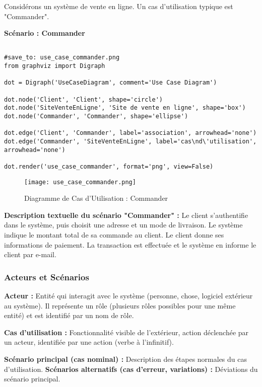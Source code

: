 \documentclass{article}
\begin{document}
\begin{itemize}
Considérons un système de vente en ligne.  Un cas d'utilisation typique est "Commander".

\textbf{Scénario : Commander}

\begin{verbatim}

#save_to: use_case_commander.png
from graphviz import Digraph

dot = Digraph('UseCaseDiagram', comment='Use Case Diagram')

dot.node('Client', 'Client', shape='circle')
dot.node('SiteVenteEnLigne', 'Site de vente en ligne', shape='box')
dot.node('Commander', 'Commander', shape='ellipse')

dot.edge('Client', 'Commander', label='association', arrowhead='none')
dot.edge('Commander', 'SiteVenteEnLigne', label='cas\nd\'utilisation', arrowhead='none')

dot.render('use_case_commander', format='png', view=False)

\end{verbatim}

\begin{figure}[H]
    \centering
    \texttt{[image: use\_case\_commander.png]}
    \caption{Diagramme de Cas d'Utilisation : Commander}
    \label{fig:use_case_commander}
\end{figure}

\noindent \textbf{Description textuelle du scénario "Commander" :}
Le client s'authentifie dans le système, puis choisit une adresse et un mode de livraison. Le système indique le montant total de sa commande au client. Le client donne ses informations de paiement. La transaction est effectuée et le système en informe le client par e-mail.

\subsubsection{Acteurs et Scénarios}

\textbf{Acteur :} Entité qui interagit avec le système (personne, chose, logiciel extérieur au système).  Il représente un rôle (plusieurs rôles possibles pour une même entité) et est identifié par un nom de rôle.

\textbf{Cas d'utilisation :} Fonctionnalité visible de l'extérieur, action déclenchée par un acteur, identifiée par une action (verbe à l'infinitif).

\textbf{Scénario principal (cas nominal) :} Description des étapes normales du cas d'utilisation.
\textbf{Scénarios alternatifs (cas d'erreur, variations) :} Déviations du scénario principal.


\end{itemize}
\end{document}

